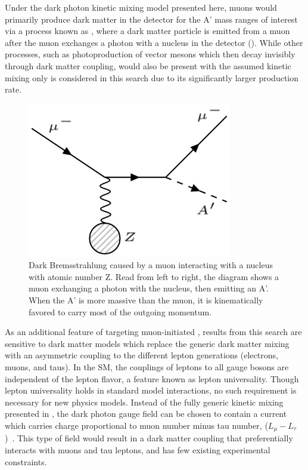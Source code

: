 Under the dark photon kinetic mixing model presented here, muons would primarily produce dark matter in the detector for the A' mass ranges of interest via a process known as \dbrem, where a dark matter particle is emitted from a muon after the muon exchanges a photon with a nucleus in the detector ().
While other processes, such as photoproduction of vector mesons which then decay invisibly through dark matter coupling, would also be present with the assumed kinetic mixing only \dbrem is considered in this search due to its significantly larger production rate.

\begin{figure}[ht]
	\centering
	\includegraphics[width=0.8\textwidth]{figures/dbrem_feyn_diagram.jpg}
        \caption[Dark Bremsstrahlung Feynman Diagram]{Dark Bremsstrahlung caused by a muon interacting with a nucleus with atomic number Z. Read from left to right, the diagram shows a muon exchanging a photon with the nucleus, then emitting an A'. When the A' is more massive than the muon, it is kinematically favored to carry most of the outgoing momentum.}
	\label{fig:dbrem_feyn}
\end{figure}

As an additional feature of targeting muon-initiated \dbrem, results from this search are sensitive to dark matter models which replace the generic dark matter mixing with an asymmetric coupling to the different lepton generations (electrons, muons, and taus).
In the SM, the couplings of leptons to all gauge bosons are independent of the lepton flavor, a feature known as lepton universality.
Though lepton universality holds in standard model interactions, no such requirement is necessary for new physics models. 
Instead of the fully generic kinetic mixing presented in , the dark photon gauge field can be chosen to contain a current which carries charge proportional to muon number minus tau number, ($L_\mu - L_\tau$)~\cite{neut_trident}.
This type of field would result in a dark matter coupling that preferentially interacts with muons and tau leptons, and has few existing experimental constraints.

